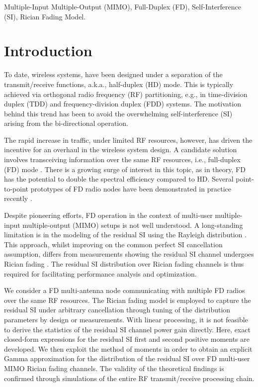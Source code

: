 \documentclass[onecolumn]{IEEEtran}
\begin{document}
\begin{IEEEkeywords}
Multiple-Input Multiple-Output (MIMO), Full-Duplex (FD), Self-Interference (SI), Rician Fading Model.
\end{IEEEkeywords}

\section{Introduction}

To date, wireless systems, have been designed under a separation of the transmit/receive functions, a.k.a., half-duplex (HD) mode. This is typically achieved via orthogonal radio frequency (RF) partitioning, e.g., in time-division duplex (TDD) and frequency-division duplex (FDD) systems. The motivation behind this trend has been to avoid the overwhelming self-interference (SI) arising from the bi-directional operation. 

The rapid increase in traffic, under limited RF resources, however, has driven the incentive for an overhaul in the wireless system design. A candidate solution involves transceiving information over the same RF resources, i.e., full-duplex (FD) mode \cite{6353396}. There is a growing surge of interest in this topic, as in theory, FD has the potential to double the spectral efficiency compared to HD. Several point-to-point prototypes of FD radio nodes have been demonstrated in practice recently \cite{179789}. 

Despite pioneering efforts, FD operation in the context of multi-user multiple-input multiple-output (MIMO) setups is not well understood. A long-standing limitation is in the modeling of the residual SI using the Rayleigh distribution \cite{6971223}. This approach, whilst improving on the common perfect SI cancellation assumption, differs from measurements showing the residual SI channel undergoes Rician fading \cite{6353396}. The residual SI distribution over Rician fading channels is thus required for facilitating performance analysis and optimization.  

We consider a FD multi-antenna node communicating with multiple FD radios over the same RF resources. The Rician fading model is employed to capture the residual SI under arbitrary cancellation through tuning of the distribution parameters by design or measurements. With linear processing, it is not feasible to derive the statistics of the residual SI channel power gain directly. Here, exact closed-form expressions for the residual SI first and second positive moments are developed. We then exploit the method of moments in order to obtain an explicit Gamma approximation for the distribution of the residual SI over FD multi-user MIMO Rician fading channels. The validity of the theoretical findings is confirmed through simulations of the entire RF transmit/receive processing chain.
\end{document}
